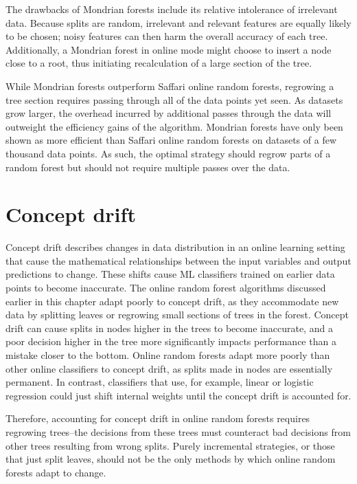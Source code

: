 The drawbacks of Mondrian forests include its relative intolerance of
irrelevant data. Because splits are random, irrelevant and relevant features
are equally likely to be chosen; noisy features can then harm the overall
accuracy of each tree. Additionally, a Mondrian forest in online mode might
choose to insert a node close to a root, thus initiating recalculation of a
large section of the tree.

While Mondrian forests outperform Saffari online random forests, regrowing a
tree section requires passing through all of the data points yet seen. As
datasets grow larger, the overhead incurred by additional passes through the
data will outweight the efficiency gains of the algorithm. Mondrian forests
have only been shown as more efficient than Saffari online random forests on
datasets of a few thousand data points. As such, the optimal strategy should
regrow parts of a random forest but should not require multiple passes over the
data.

\section{Concept drift} Concept drift describes changes in data distribution in
an online learning setting that cause the mathematical relationships between
the input variables and output predictions to change. These shifts cause ML
classifiers trained on earlier data points to become inaccurate. The online
random forest algorithms discussed earlier in this chapter adapt poorly to
concept drift, as they accommodate new data by splitting leaves or regrowing
small sections of trees in the forest. Concept drift can cause splits in nodes
higher in the trees to become inaccurate, and a poor decision higher in the
tree more significantly impacts performance than a mistake closer to the
bottom. Online random forests adapt more poorly than other online classifiers
to concept drift, as splits made in nodes are essentially permanent. In
contrast, classifiers that use, for example, linear or logistic regression
could just shift internal weights until the concept drift is accounted for.

Therefore, accounting for concept drift in online random forests requires
regrowing trees--the decisions from these trees must counteract bad decisions
from other trees resulting from wrong splits. Purely incremental strategies, or
those that just split leaves, should not be the only methods by which online
random forests adapt to change.

